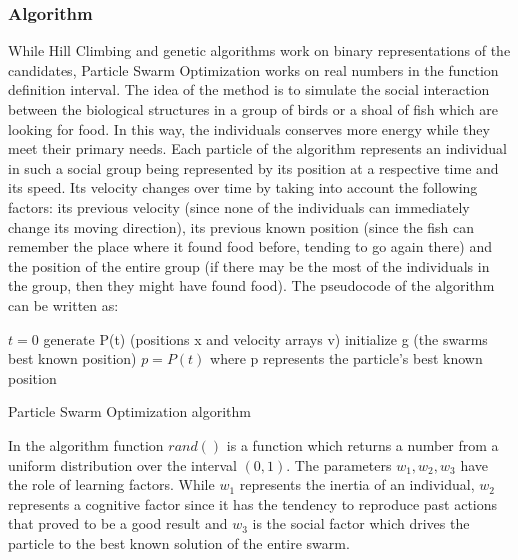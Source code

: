 \documentclass{article}
\begin{document}
\subsubsection{Algorithm}
While Hill Climbing and genetic algorithms work on binary representations of the candidates, Particle Swarm Optimization works on real numbers in the function definition interval. The idea of the method is to simulate the social interaction between the biological structures in a group of birds or a shoal of fish which are looking for food. In this way, the individuals conserves more energy while they meet their primary needs. Each particle of the algorithm represents an individual in such a social group being represented by its position at a respective time and its speed. Its velocity changes over time by taking into account the following factors: its previous velocity (since none of the individuals can immediately change its moving direction), its previous known position (since the fish can remember the place where it found food before, tending to go again there) and the position of the entire group (if there may be the most of the individuals in the group, then they might have found food).
The pseudocode of the algorithm can be written as:\\
\begin{algorithm}[H]
\SetAlgoLined
{}
 $t = 0$\;
 generate P(t) (positions x and velocity arrays v)\;
 initialize g (the swarms best known position)\;
 $p = P(t)$ where p represents the particle's best known position\;
\caption{Particle Swarm Optimization algorithm}
\end{algorithm}
In the algorithm function $rand()$ is a function which returns a number from a uniform distribution over the interval $(0,1)$. The parameters $w_1, w_2, w_3$ have the role of learning factors. While $w_1$ represents the inertia of an individual, $w_2$ represents a cognitive factor since it has the tendency to reproduce past actions that proved to be a good result and $w_3$ is the social factor which drives the particle to the best known solution of the entire swarm.
\end{document}
